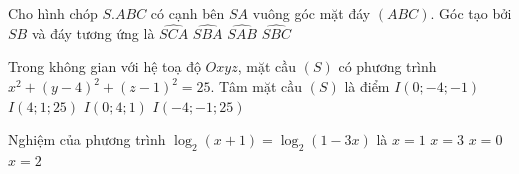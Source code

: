 \begin{ex}
	Cho hình chóp $S.ABC$ có cạnh bên $S\!A$ vuông góc mặt đáy $(ABC)$. Góc tạo bởi $S\!B$ và đáy tương ứng là
	\choice
	{$\widehat{SCA}$}
	{\True $\widehat{SBA}$}
	{$\widehat{SAB}$}
	{$\widehat{SBC}$}
\end{ex}

\begin{ex}
	Trong không gian với hệ toạ độ $Oxyz$, mặt cầu $(S)$ có phương trình $x^2+(y-4)^2+(z-1)^2=25$. Tâm mặt cầu $(S)$ là điểm
	\choice
	{$I(0;-4;-1)$}
	{$I(4;1;25)$}
	{\True $I(0;4;1)$}
	{$I(-4;-1;25)$}
\end{ex}

\begin{ex}
	Nghiệm của phương trình $\log _2(x+1)=\log _2(1-3x)$ là
	\choice
	{$x=1$}
	{$x=3$}
	{\True $x=0$}
	{$x=2$}
\end{ex}

